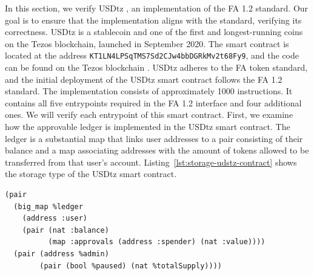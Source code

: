 \documentclass[a4paper,USenglish,cleveref, autoref, thm-restate]{lipics-v2021}
\begin{document}
In this section, we verify USDtz \cite{USDtz-implementation}, an
implementation of the FA 1.2 standard. Our goal is to ensure that the
implementation aligns with the standard, verifying its
correctness. USDtz is a stablecoin and one of the first and
longest-running coins on the Tezos blockchain, launched in September
2020. The smart contract is located at the address
\texttt{KT1LN4LPSqTMS7Sd2CJw4bbDGRkMv2t68Fy9}, and the code can be
found on the Tezos blockchain \cite{USDtz-address}. USDtz adheres to
the FA token standard, and the initial deployment of the USDtz smart
contract follows the FA 1.2 standard. 
The implementation consists of approximately 1000 instructions. It
contains all five entrypoints required in the FA 1.2 interface and
four additional ones.  We will verify each entrypoint of this smart
contract. First, we examine how the approvable ledger is implemented
in the USDtz smart contract. The ledger is a substantial map that
links user addresses to a pair consisting of their balance and a map
associating addresses with the amount of tokens allowed to be
transferred from that user's
account. Listing~\ref{lst:storage-udstz-contract} shows the storage type of the
USDtz smart contract.  

\begin{lstlisting}[float=tp,captionpos=b,caption={Storage of the USDtz smart contract},label={lst:storage-udstz-contract}]
(pair
  (big_map %ledger
    (address :user)
    (pair (nat :balance)
          (map :approvals (address :spender) (nat :value))))
  (pair (address %admin)
        (pair (bool %paused) (nat %totalSupply))))
\end{lstlisting}
\end{document}

